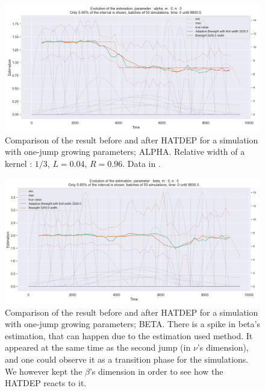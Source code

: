 \begin{figure}
\centering
\includegraphics[width = 0.90 \textwidth]{../imag/chap3/2/1.png}
\caption{Comparison of the result before and after HATDEP for a simulation with one-jump growing parameters; ALPHA. Relative width of a kernel : $1/3$, $L = 0.04$, $R = 0.96$. Data in \protect {}.}
\label{fig:first_estimate_2_alpha}
\end{figure}

\begin{figure}
\centering
\includegraphics[width = 0.90 \textwidth]{../imag/chap3/2/2.png}
\caption{Comparison of the result before and after HATDEP for a simulation with one-jump growing parameters; BETA. There is a spike in beta's estimation, that can happen due to the estimation used method. It appeared at the same time as the second jump (in $\nu$'s dimension), and one could observe it as a transition phase for the simulations. We however kept the $\beta$'s dimension in order to see how the HATDEP reacts to it.}
\label{fig:first_estimate_2_beta}
\end{figure}

